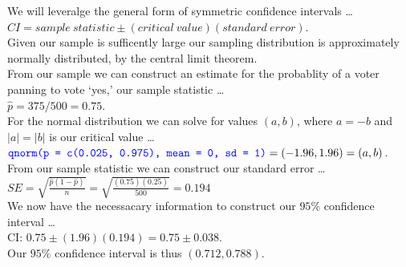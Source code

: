 \documentclass[12pt]{article}
\newcommand{\XBB}{\color{blue}}
\newcommand{\ds}{\displaystyle}
\begin{document}
\noindent
We will leveralge the general form of symmetric confidence intervals \dots \\

$ \ds CI = sample \ statistic \pm (critical \ value) (standard \ error) $.  \\

\noindent
Given our sample is sufficently large our sampling distribution is approximately normally distributed, by the central limit theorem. \\

\noindent
From our sample we can construct an estimate for the probablity of a voter panning to vote `yes,' our sample statistic \dots \\ 

$ \hat{p} = 375/500 = 0.75 $. \\

\noindent
For the normal distribution we can solve for values $ (a,b) $, where $ a = -b $ and $ | a | = | b | $ is our critical value \dots \\

$ \ds {\XBB \texttt{qnorm(p = c(0.025, 0.975), mean = 0, sd = 1)}} = (-1.96, 1.96) = (a, b) $. \\

\noindent
From our sample statistic we can construct our standard error \dots \\ 

$ \ds SE = \sqrt{ \ds \frac{\hat{p}(1 - \hat{p})}{n}} = \sqrt{ \ds \frac{(0.75)(0.25)}{500}} = 0.194 $ \\

\noindent
We now have the necessacary information to construct our $ 95\% $ confidence interval \dots \\

CI: $ 0.75 \pm (1.96)(0.194) = 0.75 \pm 0.038 $. \\

\noindent
Our $ 95\% $ confidence interval is thus $ (0.712, 0.788) $.
\end{document}
